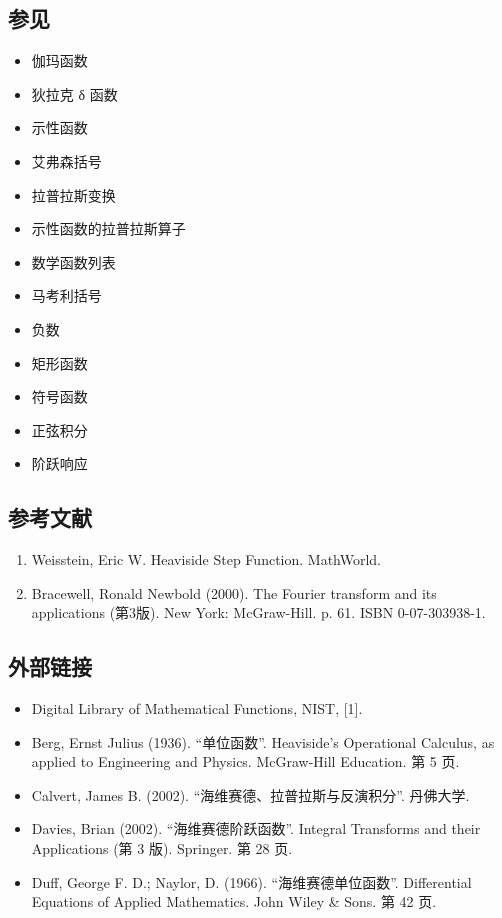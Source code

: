 \subsection{参见}
\begin{itemize}
\item 伽玛函数
\item 狄拉克 δ 函数
\item 示性函数
\item 艾弗森括号
\item 拉普拉斯变换
\item 示性函数的拉普拉斯算子
\item 数学函数列表
\item 马考利括号
\item 负数
\item 矩形函数
\item 符号函数
\item 正弦积分
\item 阶跃响应
\end{itemize}
\subsection{参考文献}
\begin{enumerate}
\item Weisstein, Eric W. Heaviside Step Function. MathWorld.
\item Bracewell, Ronald Newbold (2000). The Fourier transform and its applications (第3版). New York: McGraw-Hill. p. 61. ISBN 0-07-303938-1.
\end{enumerate}
\subsection{外部链接}
\begin{itemize}
\item Digital Library of Mathematical Functions, NIST, [1].
\item Berg, Ernst Julius (1936). “单位函数”. Heaviside's Operational Calculus, as applied to Engineering and Physics. McGraw-Hill Education. 第 5 页.
\item Calvert, James B. (2002). “海维赛德、拉普拉斯与反演积分”. 丹佛大学.
\item Davies, Brian (2002). “海维赛德阶跃函数”. Integral Transforms and their Applications (第 3 版). Springer. 第 28 页.
\item Duff, George F. D.; Naylor, D. (1966). “海维赛德单位函数”. Differential Equations of Applied Mathematics. John Wiley & Sons. 第 42 页.
\end{itemize}